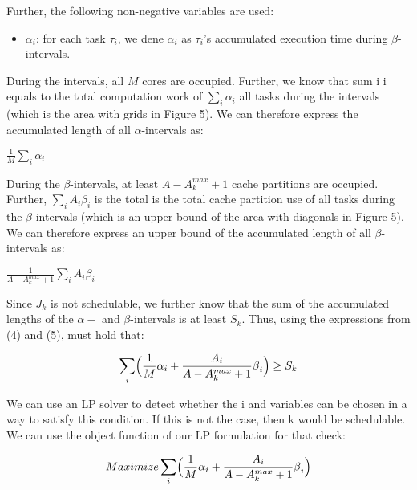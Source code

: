 \documentclass[a4paper,10pt]{article}
\begin{document}
\begin{multicols}{2}
Further, the following non-negative variables are used:

\begin{itemize}
 	\item $\alpha_i$: for each task $\tau_i$, we dene $\alpha_i$ as $\tau_i$'s accumulated execution time during $\beta$-intervals.
\end{itemize}

During the intervals, all $M$ cores are occupied. Further, we know that sum i i equals to the total computation work of $\sum_{i} \alpha_i$
all tasks during the intervals (which is the area with grids in Figure 5). We can therefore express the accumulated
length of all $\alpha$-intervals as:

\begin{center} $\frac{1}{M} \sum_{i} \alpha_i$ \end{center}

During the $\beta$-intervals, at least $A - A_{k}^{max} + 1$ cache partitions are occupied. Further, $\sum_{i} A_{i}\beta_{i}$ is the total is 
the total cache partition use of all tasks during the $\beta$-intervals (which is an upper bound of the area with diagonals in Figure 5). We
can therefore express an upper bound of the accumulated length of all $\beta$-intervals as:

\begin{center} $\frac{1}{A - A_{k}^{max} + 1}\sum_{i}A_{i}\beta_{i}$ \end{center}

Since $J_{k}$ is not schedulable, we further know that the sum of the accumulated lengths of the $\alpha-$ and $\beta$-intervals is at 
least $S_{k}$. Thus, using the expressions from (4) and (5), must hold that:

\begin{center}
\begin{equation*}
\sum_{i} \Bigl( \frac{1}{M}\alpha_{i} + \frac{A_{i}}{A - A_{k}^{max} + 1}\beta_{i}\Bigr) \ge S_{k}
\end{equation*}
\end{center}

We can use an LP solver to detect whether the i and variables can be chosen in a way to satisfy this condition.
If this is not the case, then k would be schedulable. We can use the object function of our LP formulation for that check:

\begin{center}
\begin{equation*}
Maximize \sum_{i} \Bigl( \frac{1}{M}\alpha_{i} + \frac{A_{i}}{A - A_{k}^{max} + 1}\beta_{i}\Bigr)
\end{equation*}
\end{center}


\end{multicols}
\end{document}
